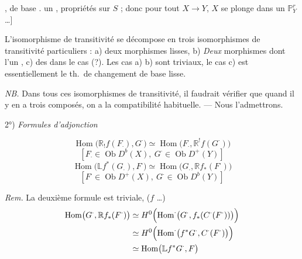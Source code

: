 \documentclass[11pt,a4paper]{article}
\begin{document}
\ill{} \ill{} \ill{} \ill{} , \ill{} \ill{} \ill{} de base \ill{}.  un  \ill{}, \struck{\ill{}} \ill{} \ill{} propriétés sur $S$ ; donc pour tout $X\to Y$, $X$ se plonge \ill{} dans un $\mathbb{P}^{r}_{Y}$ …]

L'isomorphisme de transitivité se décompose  en trois isomorphismes de transitivité particuliers : a) deux morphismes lisses, b) \emph{Deux} morphismes dont l'un , c)  des  dans le cas (?). Les cas a) b) sont triviaux, le cas c) est essentiellement le th.\ de changement de base lisse.

\emph{NB.} Dans tous ces isomorphismes de transitivité, il faudrait vérifier que quand il y en a trois composés, on a la compatibilité habituelle. — Nous l'admettrons.

\struck{\ill{}}

2°) \emph{Formules d'adjonction}


\[
\boxed{\operatorname{Hom}\bigl(\mathbb{R}_!f(F_{\cdot}),G^{\cdot}\bigr)\simeq\operatorname{Hom}\bigl(F_{\cdot},\mathbb{R}^!f(G^{\cdot})\bigr)}
\]
\[
[F_{\cdot}\in\operatorname{Ob}D^{b}(X),\ G^{\cdot}\in\operatorname{Ob}D^{+}(Y)]
\]
\[
\boxed{\operatorname{Hom}\bigl(\mathbb{L}f^{*}(G_{\cdot}),F^{\cdot}\bigr)\simeq\operatorname{Hom}\bigl(G_{\cdot},\mathbb{R}f_{*}(F^{\cdot})\bigr)}
\]
\[
[F^{\cdot}\in\operatorname{Ob}D^{+}(X),\ G^{\cdot}\in\operatorname{Ob}D^{b}(Y)]
\]

\emph{Rem.} La deuxième formule est triviale, ($f$  \ill{}  …) 
\begin{align*}
\operatorname{Hom}\bigl(G^{\cdot},\mathbb{R}f_{*}(F^{\cdot})\bigr)
&\simeq H^{0}\Bigl(\operatorname{Hom}^{\cdot}\bigl(G^{\cdot},f_{*}(C^{\cdot}(F^{\cdot}))\bigr)\Bigr)\\
&\simeq H^{0}\Bigl(\operatorname{Hom}^{\cdot}\bigl(f^{*}G^{\cdot},C^{\cdot}(F^{\cdot})\bigr)\Bigr)\\
&\simeq\operatorname{Hom}\bigl(\mathbb{L}f^{*}G^{\cdot},F\bigr)
\end{align*}
\end{document}
